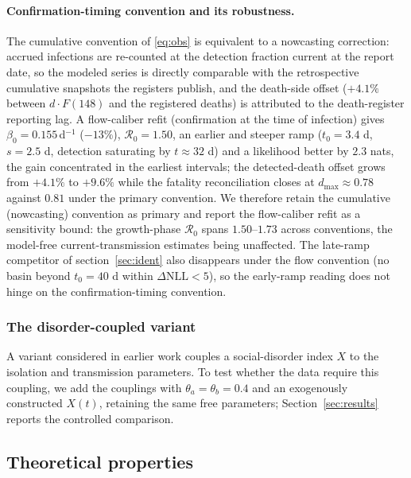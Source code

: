 \documentclass[10pt]{plos}
\newcommand{\Reff}{\mathcal{R}}
\begin{document}
\paragraph{Confirmation-timing convention and its robustness.}
The cumulative convention of \eqref{eq:obs} is equivalent to a nowcasting
correction: accrued infections are re-counted at the detection fraction
current at the report date, so the modeled series is directly comparable
with the retrospective cumulative snapshots the registers publish, and
the death-side offset ($+4.1\%$ between $d\cdot F(148)$ and the
registered deaths) is attributed to the death-register reporting lag.
A flow-caliber refit (confirmation at the time of infection) gives
$\beta_0=0.155\,$d$^{-1}$ ($-13\%$), $\Reff_0=1.50$, an earlier and
steeper ramp ($t_0=3.4$ d, $s=2.5$ d, detection saturating by
$t\approx32$ d) and a likelihood better by $2.3$ nats, the gain
concentrated in the earliest intervals; the detected-death offset grows
from $+4.1\%$ to $+9.6\%$ while the fatality reconciliation closes at
$d_{\max}\approx0.78$ against $0.81$ under the primary convention. We
therefore retain the cumulative (nowcasting) convention as primary and
report the flow-caliber refit as a sensitivity bound: the growth-phase
$\Reff_0$ spans $1.50$--$1.73$ across conventions, the model-free
current-transmission estimates being unaffected. The late-ramp
competitor of section~\ref{sec:ident} also disappears under the flow
convention (no basin beyond $t_0=40$ d within
$\Delta\mathrm{NLL}<5$), so the early-ramp reading does not hinge on
the confirmation-timing convention.
\subsubsection{The disorder-coupled variant}\label{sec:variant}

A variant considered in earlier work couples a social-disorder index $X$
to the isolation and transmission parameters. To test whether the data
require this coupling, we add the couplings with $\theta_a=\theta_b=0.4$
and an exogenously constructed $X(t)$, retaining the same free
parameters; Section~\ref{sec:results} reports the controlled comparison.

\subsection{Theoretical properties}\label{sec:theory}
\end{document}
